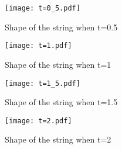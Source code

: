 \documentclass[11pt]{article}
\begin{document}
\begin{figure}[htb]
	\centering
	\texttt{[image: t=0\_5.pdf]}       
	\caption{Shape of the string when t=0.5}
\end{figure}

\begin{figure}[htb]
	\centering
	\texttt{[image: t=1.pdf]}       
	\caption{Shape of the string when t=1}
\end{figure}

\begin{figure}[htb]
	\centering
	\texttt{[image: t=1\_5.pdf]}       
	\caption{Shape of the string when t=1.5}
\end{figure}

\begin{figure}[htb]
	\centering
	\texttt{[image: t=2.pdf]}       
	\caption{Shape of the string when t=2}
\end{figure}
\end{document}
